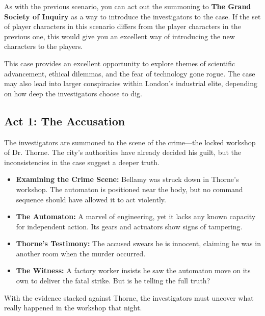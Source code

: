 \begin{WyrdGmTips}
    As with the previous scenario, you can act out the summoning to \textbf{The Grand Society of Inquiry} as a way to introduce the investigators to the case. If the set of player characters in this scenario differs from the player characters in the previous one, this would give you an excellent way of introducing the new characters to the players.
\end{WyrdGmTips}

\begin{WyrdGmTips}
    This case provides an excellent opportunity to explore themes of scientific advancement, ethical dilemmas, and the fear of technology gone rogue. The case may also lead into larger conspiracies within London's industrial elite, depending on how deep the investigators choose to dig.
\end{WyrdGmTips}

\subsection{Act 1: The Accusation}  
The investigators are summoned to the scene of the crime—the locked workshop of Dr. Thorne. The city’s authorities have already decided his guilt, but the inconsistencies in the case suggest a deeper truth.

\begin{WyrdExplanation}
    \begin{itemize}
        \item \textbf{Examining the Crime Scene:} Bellamy was struck down in Thorne’s workshop. The automaton is positioned near the body, but no command sequence should have allowed it to act violently.
        \item \textbf{The Automaton:} A marvel of engineering, yet it lacks any known capacity for independent action. Its gears and actuators show signs of tampering.
        \item \textbf{Thorne’s Testimony:} The accused swears he is innocent, claiming he was in another room when the murder occurred.
        \item \textbf{The Witness:} A factory worker insists he saw the automaton move on its own to deliver the fatal strike. But is he telling the full truth?
    \end{itemize}
\end{WyrdExplanation}

\noindent
With the evidence stacked against Thorne, the investigators must uncover what really happened in the workshop that night.

